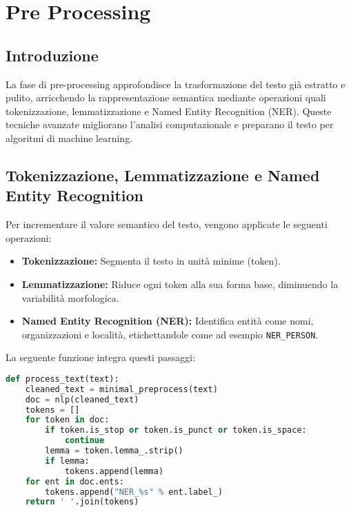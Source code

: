 \chapter{Pre Processing}

\section{Introduzione}
La fase di pre-processing approfondisce la trasformazione del testo già estratto e pulito, arricchendo la rappresentazione semantica mediante operazioni quali tokenizzazione, lemmatizzazione e Named Entity Recognition (NER). Queste tecniche avanzate migliorano l'analisi computazionale e preparano il testo per algoritmi di machine learning.

\section{Tokenizzazione, Lemmatizzazione e Named Entity Recognition}
Per incrementare il valore semantico del testo, vengono applicate le seguenti operazioni:
\begin{itemize}
    \item \textbf{Tokenizzazione:} Segmenta il testo in unità minime (token).
    \item \textbf{Lemmatizzazione:} Riduce ogni token alla sua forma base, diminuendo la variabilità morfologica.
    \item \textbf{Named Entity Recognition (NER):} Identifica entità come nomi, organizzazioni e località, etichettandole come ad esempio \texttt{NER\_PERSON}.
\end{itemize}

La seguente funzione integra questi passaggi:

\begin{lstlisting}[language=Python,caption={Funzione process_text}]
def process_text(text):
    cleaned_text = minimal_preprocess(text)
    doc = nlp(cleaned_text)
    tokens = []
    for token in doc:
        if token.is_stop or token.is_punct or token.is_space:
            continue
        lemma = token.lemma_.strip()
        if lemma:
            tokens.append(lemma)
    for ent in doc.ents:
        tokens.append("NER_%s" % ent.label_)
    return ' '.join(tokens)
\end{lstlisting}

